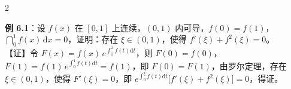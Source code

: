 \documentclass[a4paper,11pt]{article}
\begin{document}
\begin{multicols}{2}
        \vspace{0.6em}

        \textbf{例 6.1}：设 $f(x)$ 在 $[0, 1]$ 上连续，$(0, 1)$ 内可导，$f(0) = f(1)$，$\dint_{0}^{1} f(x)\,\mathrm{d}x = 0$，证明：存在 $\xi \in (0, 1)$，使得 $f'(\xi) + f^{2}(\xi) = 0$。
        \\【证】令 $F(x) = f(x)\,e^{\int_{0}^{x} f(t)\mathrm{d}t}$，则 $F(0) = f(0)$，$F(1) = f(1)\,e^{\int_{0}^{1} f(t)\mathrm{d}t} = f(1)$，即 $F(0) = F(1)$，由罗尔定理，存在 $\xi \in (0, 1)$，使得 $F'(\xi) = 0$，即 $e^{\int_{0}^{\xi} f(t)\mathrm{d}t}\bigl[f'(\xi) + f^{2}(\xi)\bigr] = 0$，得证。
\end{multicols}
\end{document}
